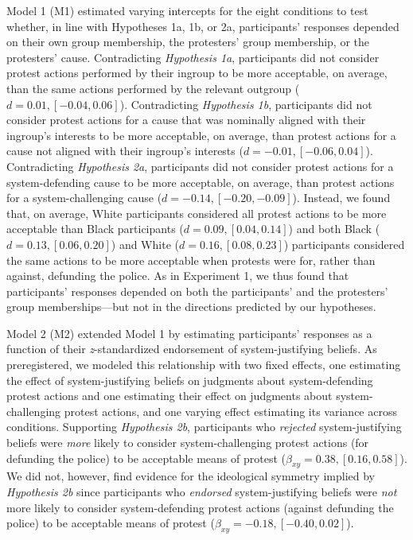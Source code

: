 \documentclass[12pt, letterpaper]{article}
\begin{document}
Model 1 (M1) estimated varying intercepts for the eight conditions to
test whether, in line with Hypotheses 1a, 1b, or 2a, participants'
responses depended on their own group membership, the protesters' group
membership, or the protesters' cause. Contradicting \emph{Hypothesis
1a}, participants did not consider protest actions performed by their
ingroup to be more acceptable, on average, than the same actions
performed by the relevant outgroup (\(d = 0.01, [-0.04, 0.06]\)).
Contradicting \emph{Hypothesis 1b}, participants did not consider
protest actions for a cause that was nominally aligned with their
ingroup's interests to be more acceptable, on average, than protest
actions for a cause not aligned with their ingroup's interests
(\(d = -0.01, [-0.06, 0.04]\)). Contradicting \emph{Hypothesis 2a},
participants did not consider protest actions for a system-defending
cause to be more acceptable, on average, than protest actions for a
system-challenging cause (\(d = -0.14, [-0.20, -0.09]\)). Instead, we
found that, on average, White participants considered all protest
actions to be more acceptable than Black participants
(\(d = 0.09, [0.04, 0.14]\)) and both Black (\(d = 0.13, [0.06, 0.20]\))
and White (\(d = 0.16, [0.08, 0.23]\)) participants considered the same
actions to be more acceptable when protests were for, rather than
against, defunding the police. As in Experiment 1, we thus found that
participants' responses depended on both the participants' and the
protesters' group memberships---but not in the directions predicted by
our hypotheses.

Model 2 (M2) extended Model 1 by estimating participants' responses as a
function of their \emph{z}-standardized endorsement of system-justifying
beliefs. As preregistered, we modeled this relationship with two fixed
effects, one estimating the effect of system-justifying beliefs on
judgments about system-defending protest actions and one estimating
their effect on judgments about system-challenging protest actions, and
one varying effect estimating its variance across conditions. Supporting
\emph{Hypothesis 2b}, participants who \emph{rejected} system-justifying
beliefs were \emph{more} likely to consider system-challenging protest
actions (for defunding the police) to be acceptable means of protest
(\(\beta_{xy} = 0.38, [0.16, 0.58]\)). We did not, however, find
evidence for the ideological symmetry implied by \emph{Hypothesis 2b}
since participants who \emph{endorsed} system-justifying beliefs were
\emph{not} more likely to consider system-defending protest actions
(against defunding the police) to be acceptable means of protest
(\(\beta_{xy} = -0.18, [-0.40, 0.02]\)).
\end{document}
